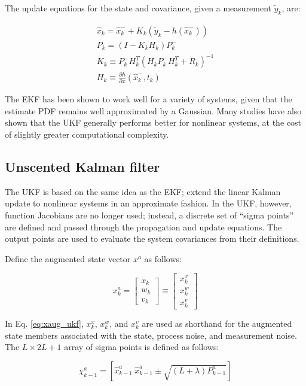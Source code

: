 \documentclass[]{article}
\begin{document}
The update equations for the state and covariance, given a measurement $\tilde{y}_k$, are:

\begin{align}
\hat{x}_k = \hat{x}_k^- + K_k(\tilde{y}_k-h(\hat{x}_k^-)) \\
P_k = (I-K_kH_k)P_k^- \\
K_k \equiv P_k^- H_k^T (H_k P_k^- H_k^T + R_k)^{-1} \\
H_k \equiv \frac{\partial h}{\partial x} (\hat{x}_k^-,t_k)
\end{align}

The EKF has been shown to work well for a variety of systems, given that the estimate PDF remains well approximated by a Gaussian. Many studies have also shown that the UKF generally performs better for nonlinear systems, at the cost of slightly greater computational complexity.

\subsection{Unscented Kalman filter}

The UKF is based on the same idea as the EKF; extend the linear Kalman update to nonlinear systems in an approximate fashion. In the UKF, however, function Jacobians are no longer used; instead, a discrete set of ``sigma points'' are defined and passed through the propagation and update equations. The output points are used to evaluate the system covariances from their definitions.

Define the augmented state vector $x^a$ as follows:

\begin{equation}
x^a_k = \begin{bmatrix}
x_k \\w_k \\v_k
\end{bmatrix} \equiv \begin{bmatrix}
x^x_k \\x^w_k \\x^v_k
\end{bmatrix}
\label{eq:xaug_ukf}
\end{equation}

In Eq. \ref{eq:xaug_ukf}, $x^x_k$, $x^w_k$, and $x^v_k$ are used as shorthand for the augmented state members associated with the state, process noise, and measurement noise. The $L \times 2L+1$ array of sigma points is defined as follows:

\begin{equation}
\chi^a_{k-1} = [\hat{x}^a_{k-1} \ \hat{x}^a_{k-1}\pm \sqrt{(L+\lambda)P_{k-1}^a}]
\end{equation}
\end{document}
